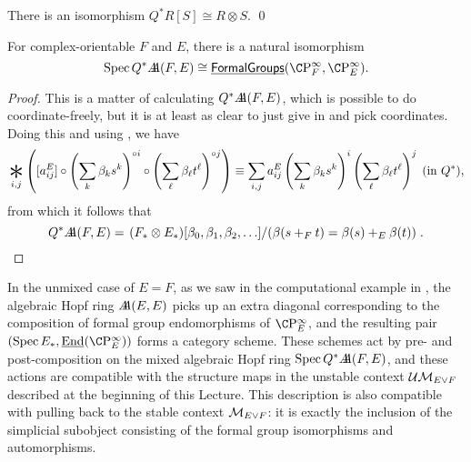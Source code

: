 \begin{corollary}\label{QAstAndTensors}
There is an isomorphism $Q^* R[S] \cong R \otimes S$. \qed
\end{corollary}

\begin{corollary}
For complex-orientable $F$ and $E$, there is a natural isomorphism \[\Spec Q^* \AA(F, E) \cong \InternalHom{FormalGroups}(\CP^\infty_F, \CP^\infty_E).\]
\end{corollary}
\begin{proof}
This is a matter of calculating $Q^* \AA(F, E)$, which is possible to do coordinate-freely, but it is at least as clear to just give in and pick coordinates.  Doing this and using , we have \[\bigast_{i, j} \left([a_{ij}^E] \circ \left( \sum_k \beta_k s^k \right)^{\circ i} \circ \left( \sum_\ell \beta_\ell t^\ell \right)^{\circ j} \right) \equiv \sum_{i, j} a_{ij}^E \left( \sum_k \beta_k s^k \right)^i \left( \sum_\ell \beta_\ell t^\ell \right)^j \;\text{(in $Q^*$)},\] from which it follows that \[Q^* \AA(F, E) = \left. (F_* \otimes E_*)[\beta_0, \beta_1, \beta_2, \ldots] \middle/ \left( \beta(s +_F t) = \beta(s) +_E \beta(t) \right) \right. . \qedhere\]
\end{proof}


\begin{remark}
In the unmixed case of $E = F$, as we saw in the computational example in , the algebraic Hopf ring $\AA(E, E)$ picks up an extra diagonal corresponding to the composition of formal group endomorphisms of $\CP^\infty_E$, and the resulting pair $(\Spec E_*, \underline{\operatorname{End}}(\CP^\infty_E))$ forms a category scheme.  These schemes act by pre- and post-composition on the mixed algebraic Hopf ring $\Spec Q^* \AA(F, E)$, and these actions are compatible with the structure maps in the unstable context $\Ucontext{E \vee F}$ described at the beginning of this Lecture.  This description is also compatible with pulling back to the stable context $\context{E \vee F}$: it is exactly the inclusion of the simplicial subobject consisting of the formal group isomorphisms and automorphisms.
\end{remark}

